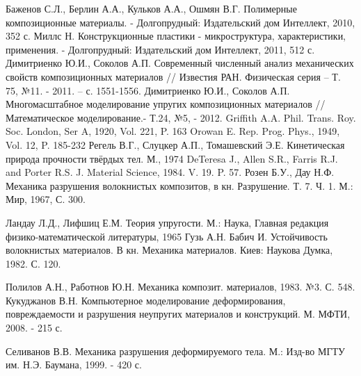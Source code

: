 \begin{thebibliography}{99}
Баженов С.Л., Берлин А.А., Кульков А.А., Ошмян В.Г. Полимерные композиционные материалы. - Долгопрудный: Издательский дом Интеллект, 2010, 352 с.
Миллс Н. Конструкционные пластики - микроструктура, характеристики, применения. - Долгопрудный: Издательский дом Интеллект, 2011, 512 с.
Димитриенко Ю.И., Соколов А.П. Современный численный анализ механических свойств композиционных материалов // Известия РАН. Физическая серия – Т. 75, №11. - 2011. – с. 1551-1556. 
Димитриенко Ю.И., Соколов А.П. Многомасштабное моделирование упругих композиционных материалов // Математическое моделирование.- Т.24, №5, - 2012.
Griffith A.A. Phil. Trans. Roy. Soc. London, Ser A, 1920, Vol. 221, P. 163
 Orowan E. Rep. Prog. Phys., 1949, Vol. 12, P. 185-232
Регель В.Г., Слуцкер А.П., Томашевский Э.Е. Кинетическая природа прочности твёрдых тел. М., 1974
DeTeresa J., Allen S.R., Farris R.J. and Porter R.S. J. Material Science, 1984. V. 19. P. 57.
Розен Б.У., Дау Н.Ф. Механика разрушения волокнистых композитов, в кн. Разрушение. Т. 7. Ч. 1. М.: Мир, 1967, С. 300.

Ландау Л.Д., Лифшиц Е.М. Теория упругости. М.: Наука, Главная редакция физико-математической литературы, 1965
Гузь А.Н. Бабич И. Устойчивость волокнистых материалов. В кн. Механика материалов. Киев: Наукова Думка, 1982. С. 120.

Полилов А.Н., Работнов Ю.Н. Механика композит. материалов, 1983. №3. С. 548.
Кукуджанов В.Н. Компьютерное моделирование деформирования, повреждаемости и разрушения неупругих материалов и конструкций. М. МФТИ, 2008. - 215 с.

Селиванов В.В. Механика разрушения деформируемого тела. М.: Изд-во МГТУ им. Н.Э. Баумана, 1999. - 420 с.


\end{thebibliography}
